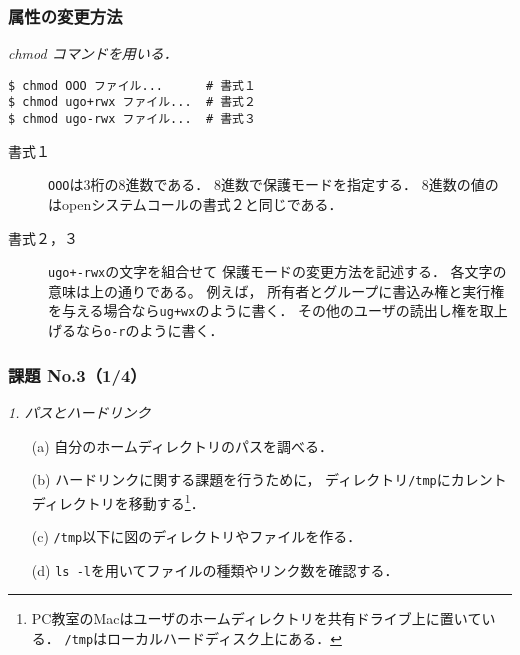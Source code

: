 \documentclass{beamer}                 %
\begin{document}
\begin{frame}[fragile]
  \frametitle{属性の変更方法}
  \emph{chmod コマンドを用いる．}\\
  \begin{minipage}{0.48\columnwidth}
  \begin{lstlisting}[numbers=none]
$ chmod OOO ファイル...      # 書式１
$ chmod ugo+rwx ファイル...  # 書式２
$ chmod ugo-rwx ファイル...  # 書式３
  \end{lstlisting}
  \end{minipage}
  \begin{minipage}{0.48\columnwidth}
  \end{minipage}

\begin{description}
\item[書式１] \texttt{OOO}は3桁の8進数である．
8進数で保護モードを指定する．
8進数の値のはopenシステムコールの書式２と同じである．

\item[書式２，３] \texttt{ugo+-rwx}の文字を組合せて
保護モードの変更方法を記述する．
各文字の意味は上の通りである。
例えば，
所有者とグループに書込み権と実行権を与える場合なら\texttt{ug+wx}のように書く．
その他のユーザの読出し権を取上げるなら\texttt{o-r}のように書く．
\end{description}
\end{frame}


\begin{frame}[fragile]
  \frametitle{課題 No.3（1/4）}
  \emph{1. パスとハードリンク}
\begin{enumerate}
\item[(a)] 自分のホームディレクトリのパスを調べる．
\item[(b)] ハードリンクに関する課題を行うために，
ディレクトリ\texttt{/tmp}にカレントディレクトリを移動する\footnote{
PC教室のMacはユーザのホームディレクトリを共有ドライブ上に置いている．
\texttt{/tmp}はローカルハードディスク上にある．}．
\item[(c)] \texttt{/tmp}以下に図のディレクトリやファイルを作る．
\item[(d)] \texttt{ls -l}を用いてファイルの種類やリンク数を確認する．
\end{enumerate}

\end{frame}
\end{document}
